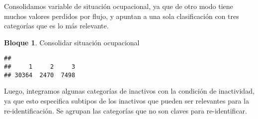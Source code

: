 \documentclass[
]{book}
\newenvironment{Shaded}{\begin{snugshade}}{\end{snugshade}}
\newcommand{\CommentTok}[1]{\textcolor[rgb]{0.56,0.35,0.01}{\textit{#1}}}
\newcommand{\ConstantTok}[1]{\textcolor[rgb]{0.00,0.00,0.00}{#1}}
\newcommand{\DecValTok}[1]{\textcolor[rgb]{0.00,0.00,0.81}{#1}}
\newcommand{\FunctionTok}[1]{\textcolor[rgb]{0.00,0.00,0.00}{#1}}
\newcommand{\NormalTok}[1]{#1}
\newcommand{\OtherTok}[1]{\textcolor[rgb]{0.56,0.35,0.01}{#1}}
\newcommand{\SpecialCharTok}[1]{\textcolor[rgb]{0.00,0.00,0.00}{#1}}
\theoremstyle{definition}
\theoremstyle{definition}
\newtheorem{example}{Bloque}[chapter]
\theoremstyle{definition}
\theoremstyle{definition}
\theoremstyle{remark}
\begin{document}
Consolidamos variable de situación ocupacional, ya que de otro modo tiene muchos valores perdidos por flujo, y apuntan a una sola clasificación con tres categorías que es lo más relevante.

\begin{example}
\protect\hypertarget{exm:bloque31nbm}{}\label{exm:bloque31nbm}Consolidar situación ocupacional
\end{example}

\begin{Shaded}
\end{Shaded}

\begin{verbatim}
## 
##     1     2     3 
## 30364  2470  7498
\end{verbatim}

Luego, integramos algunas categorías de inactivos con la condición de inactividad, ya que esto especifica subtipos de los inactivos que pueden ser relevantes para la re-identificación. Se agrupan las categorías que no son claves para re-identificar.
\end{document}
